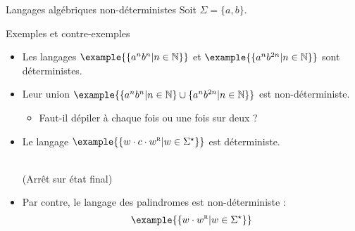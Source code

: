 \begin{frame}{Langages algébriques non-déterministes}
  Soit $\Sigma = \{a, b\}$.
  
  \begin{exampleblock}{Exemples et contre-exemples}
    \begin{itemize}
    \item Les langages $\example{\{ a^n b^n | n\in \mathbb{N}\}}$ et $\example{\{ a^n b^{2n} | n\in \mathbb{N}\}}$ sont déterministes.
    \item Leur union $\example{\{ a^n b^n | n\in \mathbb{N}\} \cup \{ a^n b^{2n} | n\in \mathbb{N}\}}$ est non-déterministe.
      \begin{itemize}
      \item Faut-il dépiler à chaque fois ou une fois sur deux ? 
      \end{itemize}
    \item Le langage $\example{\{ w \cdot c \cdot w^{\textsc{r}} | w\in \Sigma^\star\}}$ est déterministe.
      \begin{center}
        \\
        (Arrêt sur état final)
      \end{center}
    \item Par contre, le langage des palindromes est non-déterministe :
      $$\example{\{ w \cdot w^{\textsc{r}} | w\in \Sigma^\star\}}$$
    \end{itemize}
  \end{exampleblock}
  
\end{frame}


